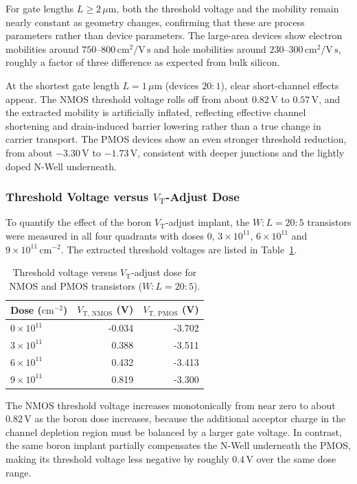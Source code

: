 For gate lengths $L \ge 2\,\mu\mathrm{m}$, both the threshold voltage and the mobility remain nearly constant as geometry changes, confirming that these are process parameters rather than device parameters. The large-area devices show electron mobilities around $750$--$800\,\mathrm{cm}^2/\mathrm{V\,s}$ and hole mobilities around $230$--$300\,\mathrm{cm}^2/\mathrm{V\,s}$, roughly a factor of three difference as expected from bulk silicon.

At the shortest gate length $L = 1\,\mu\mathrm{m}$ (devices $20:1$), clear short-channel effects appear. The NMOS threshold voltage rolls off from about $0.82$\,V to $0.57$\,V, and the extracted mobility is artificially inflated, reflecting effective channel shortening and drain-induced barrier lowering rather than a true change in carrier transport. The PMOS devices show an even stronger threshold reduction, from about $-3.30$\,V to $-1.73$\,V, consistent with deeper junctions and the lightly doped N-Well underneath.

\subsubsection{Threshold Voltage versus $V_\mathrm{T}$-Adjust Dose}

To quantify the effect of the boron $V_\mathrm{T}$-adjust implant, the $W:L = 20:5$ transistors were measured in all four quadrants with doses $0$, $3\times10^{11}$, $6\times10^{11}$ and $9\times10^{11}\,\mathrm{cm}^{-2}$. The extracted threshold voltages are listed in Table~\ref{tab:ch7-vt-dose}.

\begin{table}[htbp]
  \centering
  \caption{Threshold voltage versus $V_\mathrm{T}$-adjust dose for NMOS and PMOS transistors ($W:L = 20:5$).}
  \label{tab:ch7-vt-dose}
  \begin{tabular}{lrr}
    \toprule
    Dose ($\mathrm{cm}^{-2}$) & $V_\mathrm{T,\ NMOS}$ (V) & $V_\mathrm{T,\ PMOS}$ (V) \\
    \midrule
    $0\times10^{11}$ & -0.034 & -3.702 \\
    $3\times10^{11}$ &  0.388 & -3.511 \\
    $6\times10^{11}$ &  0.432 & -3.413 \\
    $9\times10^{11}$ &  0.819 & -3.300 \\
    \bottomrule
  \end{tabular}
\end{table}

The NMOS threshold voltage increases monotonically from near zero to about $0.82$\,V as the boron dose increases, because the additional acceptor charge in the channel depletion region must be balanced by a larger gate voltage. In contrast, the same boron implant partially compensates the N-Well underneath the PMOS, making its threshold voltage less negative by roughly $0.4$\,V over the same dose range.

